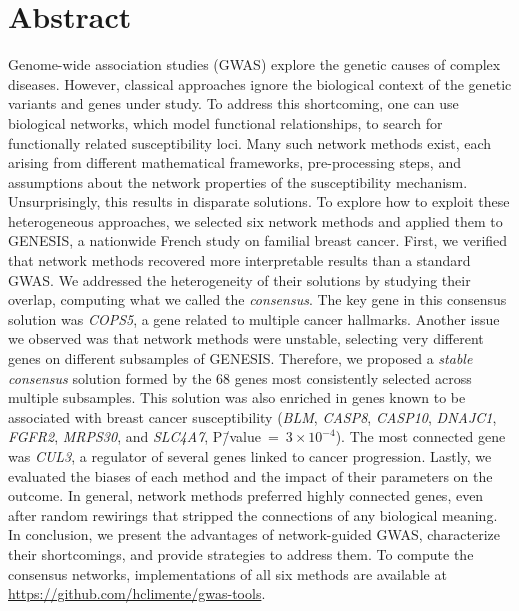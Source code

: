 \documentclass[10pt,letterpaper]{article}
\begin{document}
\section*{Abstract}
Genome-wide association studies (GWAS) explore the genetic causes of complex diseases. However, classical approaches ignore the biological context of the genetic variants and genes under study. To address this shortcoming, one can use biological networks, which model functional relationships, to search for functionally related susceptibility loci. Many such network methods exist, each arising from different mathematical frameworks, pre-processing steps, and assumptions about the network properties of the susceptibility mechanism. Unsurprisingly, this results in disparate solutions. To explore how to exploit these heterogeneous approaches, we selected six network methods and applied them to GENESIS, a nationwide French study on familial breast cancer. First, we verified that network methods recovered more interpretable results than a standard GWAS. We addressed the heterogeneity of their solutions by studying their overlap, computing what we called the \emph{consensus}. The key gene in this consensus solution was \emph{COPS5}, a gene related to multiple cancer hallmarks. Another issue we observed was that network methods were unstable, selecting very different genes on different subsamples of GENESIS. Therefore, we proposed a \emph{stable consensus} solution formed by the 68 genes most consistently selected across multiple subsamples. This solution was also enriched in genes known to be associated with breast cancer susceptibility (\emph{BLM}, \emph{CASP8}, \emph{CASP10}, \emph{DNAJC1}, \emph{FGFR2}, \emph{MRPS30}, and \emph{SLC4A7}, P\=/value~=~$3 \times 10^{-4}$). The most connected gene was \emph{CUL3}, a regulator of several genes linked to cancer progression. Lastly, we evaluated the biases of each method and the impact of their parameters on the outcome. In general, network methods preferred highly connected genes, even after random rewirings that stripped the connections of any biological meaning. In conclusion, we present the advantages of network-guided GWAS, characterize their shortcomings, and provide strategies to address them. To compute the consensus networks, implementations of all six methods are available at \url{https://github.com/hclimente/gwas-tools}.

\end{document}

